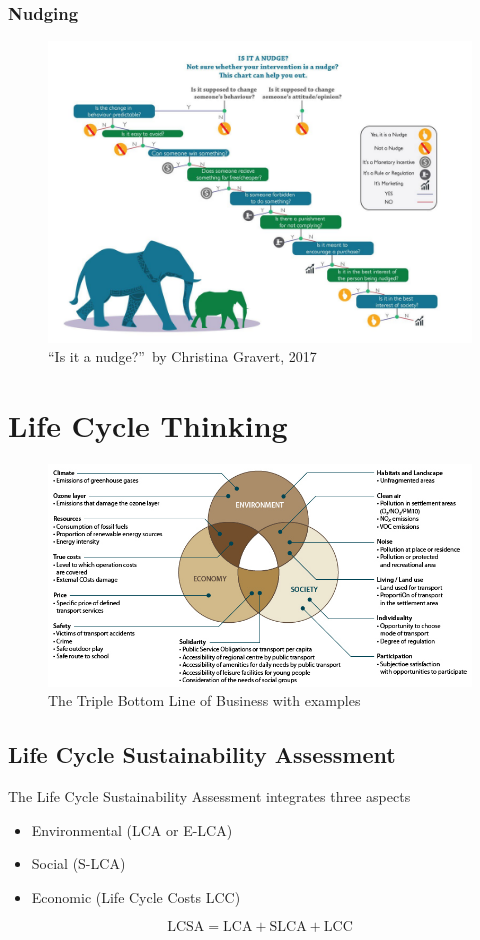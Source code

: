 \documentclass[11pt]{article}
\theoremstyle{definition}
\begin{document}

\subsubsection{Nudging}
\begin{figure}[H]
	\centering
	\includegraphics[width=0.7\linewidth]{img/nudging}
	\caption{\textquotedblleft Is it a nudge?\textquotedblright\ by Christina Gravert, 2017}
	\label{fig:nudging}
\end{figure}


\section{Life Cycle Thinking}

\begin{figure}[H]
	\centering
	\includegraphics[width=0.8\linewidth]{img/three_modes_development.jpg}
	\caption{The Triple Bottom Line of Business with examples}
\end{figure}

\subsection{Life Cycle Sustainability Assessment}
The Life Cycle Sustainability Assessment integrates three aspects
\begin{itemize}
	\item Environmental (LCA or E-LCA)
	\item Social (S-LCA)
	\item Economic (Life Cycle Costs LCC)
\end{itemize}
\begin{equation*}
	\text{LCSA} = \text{LCA} + \text{SLCA} + \text{LCC}
\end{equation*}
\end{document}
